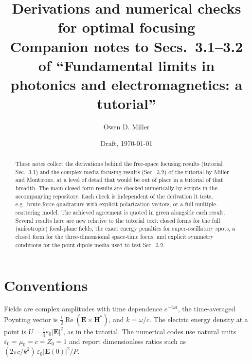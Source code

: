 \documentclass[11pt,letterpaper]{article}
\title{Derivations and numerical checks for optimal focusing\\[4pt]
\large Companion notes to Secs.~3.1--3.2 of ``Fundamental limits in photonics and electromagnetics: a tutorial''}
\author{Owen D. Miller}
\date{Draft, \today}
\newcommand{\vect}[1]{\mathbf{#1}}
\newcommand{\Ev}{\vect{E}}
\newcommand{\Hv}{\vect{H}}
\renewcommand{\Re}{\operatorname{Re}}
\begin{document}
\maketitle

\begin{abstract}
These notes collect the derivations behind the free-space focusing results (tutorial Sec.~3.1) and the complex-media focusing results (Sec.~3.2) of the tutorial by Miller and Monticone, at a level of detail that would be out of place in a tutorial of that breadth. The main closed-form results are checked numerically by scripts in the accompanying repository. Each check is independent of the derivation it tests, e.g.\ brute-force quadrature with explicit polarization vectors, or a full multiple-scattering model. The achieved agreement is quoted in green alongside each result. Several results here are new relative to the tutorial text: closed forms for the full (anisotropic) focal-plane fields, the exact energy penalties for super-oscillatory spots, a closed form for the three-dimensional space-time focus, and explicit symmetry conditions for the point-dipole media used to test Sec.~3.2.
\end{abstract}

\tableofcontents

\section{Conventions}
Fields are complex amplitudes with time dependence $e^{-i\omega t}$, the time-averaged Poynting vector is $\tfrac12\Re(\Ev\times\Hv^*)$, and $k=\omega/c$. The electric energy density at a point is $U=\tfrac14\varepsilon_0|\Ev|^2$, as in the tutorial. The numerical codes use natural units $\varepsilon_0=\mu_0=c=Z_0=1$ and report dimensionless ratios such as $(2\pi c/k^2)\,\varepsilon_0|\Ev(0)|^2/P$.
\end{document}

